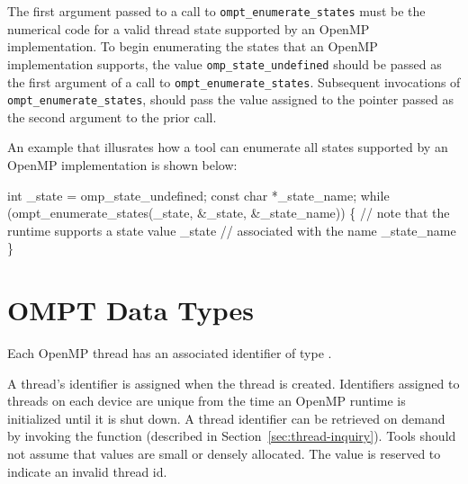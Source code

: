 \constraints

The first argument passed to a call to \verb|ompt_enumerate_states| must
be the numerical code for a valid thread state supported by an OpenMP
implementation.  
To begin enumerating the states that an OpenMP implementation supports,
the value \verb|omp_state_undefined| should be passed as the
first argument of a call to \verb|ompt_enumerate_states|.
Subsequent invocations of \verb|ompt_enumerate_states|,
should pass the value 
assigned to the pointer passed as the second argument to the prior call.

An example that illusrates how a tool can enumerate all states 
supported by an OpenMP implementation is shown below:

\ccppspecificstart
\begin{boxedcode}
int _state = omp_state_undefined;
const char *_state_name;
while (ompt_enumerate_states(_state, &_state, &_state_name)) \{
  // note that the runtime supports a state value _state 
  // associated with the name _state_name 
\}
\end{boxedcode}
\ccppspecificend

\section{OMPT Data Types}
\label{sec:data}


Each OpenMP thread  has an associated identifier of type .
\begin{comment}
\begin{boxedcode}
typedef uint64\_t ompt\_thread\_id\_t;
\end{boxedcode}
\end{comment}
  A thread's identifier is assigned when the thread is created.
  Identifiers assigned to threads on each device are unique from the time an OpenMP runtime is initialized until it is shut down.
  A thread identifier can be retrieved
  on demand by invoking the  
  function (described in Section~\ref{sec:thread-inquiry}).
  Tools should not assume that  values are small or densely allocated.
  The value  is reserved to indicate an invalid thread id.


